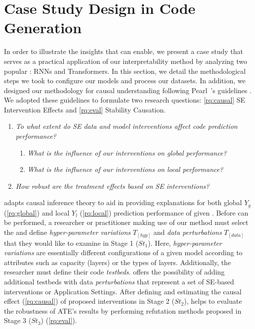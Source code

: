 \section{Case Study Design in Code Generation}
\label{sec:design-conditioned}

In order to illustrate the insights that \codegen can enable, we present a case study that serves as a practical application of our interpretability method by analyzing two popular \nlms: RNNs and Transformers. In this section, we detail the methodological steps we took to configure our models and process our datasets. In addition, we designed our methodology for causal understanding following Pearl~\etal's guidelines \citep{Pearl2016Causality,Sharma2021DoWhyAssumptions}. We adopted these guidelines to formulate two research questions: \ref{rq:causal} SE Intervention Effects and \ref{rq:eval} Stability Causation.

\begin{enumerate}[label=\textbf{RQ$_{\arabic*}$:}, ref=\textbf{RQ$_{\arabic*}$}, wide, labelindent=5pt]\setlength{\itemsep}{0.2em}
      \item \label{rq:causal} {\textit{To what extent do SE data and model interventions affect code prediction performance?}} 
       \begin{enumerate}[label=\textbf{RQ$_{1.\arabic*}$:}, ref=\textbf{RQ$_{1.\arabic*}$}, wide, leftmargin=0.5cm]\setlength{\itemsep}{0.2em}
        \item \label{rq:global}{\textit{What is the influence of our interventions on global performance?}}
        \item \label{rq:local}{\textit{What is the influence of our interventions on local performance?}}
        \end{enumerate}
      \item \label{rq:eval} {\textit{How robust are the treatment effects based on SE interventions?}}
\end{enumerate}

 

\codegen adapts causal inference theory to aid in providing explanations for both global $Y_g$ (\ref{rq:global}) and local $Y_l$ (\ref{rq:local}) prediction performance of given \nlms. Before \codegen can be performed, a researcher or practitioner making use of our method must select the \nlms and define \textit{hyper-parameter variations} $T_{[hyp]}$ and \textit{data perturbations} $T_{[data]}$ that they would like to examine in Stage 1 ($St_1$). Here, \textit{hyper-parameter variations} are essentially different configurations of a given model according to attributes such as capacity (layers) or the types of layers. Additionally, the researcher must define their code \textit{testbeds}. \codegen offers the possibility of adding additional testbeds with data \textit{perturbations} that represent a set of SE-based interventions or Application Settings. After defining and estimating the causal effect (\ref{rq:causal}) of proposed interventions in Stage 2 ($St_2$), \codegen helps to evaluate the robustness of ATE's results by performing refutation methods proposed in Stage 3 ($St_3$) (\ref{rq:eval}).

